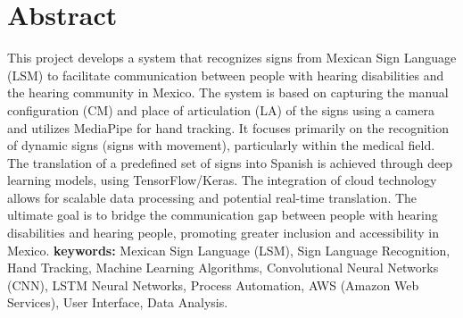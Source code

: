 \documentclass[spanish]{book}
\begin{document}
\chapter*{Abstract}
This project develops a system that recognizes signs from Mexican Sign Language (LSM) to facilitate communication between people with hearing disabilities and the hearing community in Mexico. The system is based on capturing the manual configuration (CM) and place of articulation (LA) of the signs using a camera and utilizes MediaPipe for hand tracking. It focuses primarily on the recognition of dynamic signs (signs with movement), particularly within the medical field. The translation of a predefined set of signs into Spanish is achieved through deep learning models, using TensorFlow/Keras. The integration of cloud technology allows for scalable data processing and potential real-time translation. The ultimate goal is to bridge the communication gap between people with hearing disabilities and hearing people, promoting greater inclusion and accessibility in Mexico.
\textbf{keywords:}
Mexican Sign Language (LSM), Sign Language Recognition, Hand Tracking, Machine Learning Algorithms, Convolutional Neural Networks (CNN), LSTM Neural Networks, Process Automation, AWS (Amazon Web Services), User Interface, Data Analysis.











    \printbibliography
\end{document}
